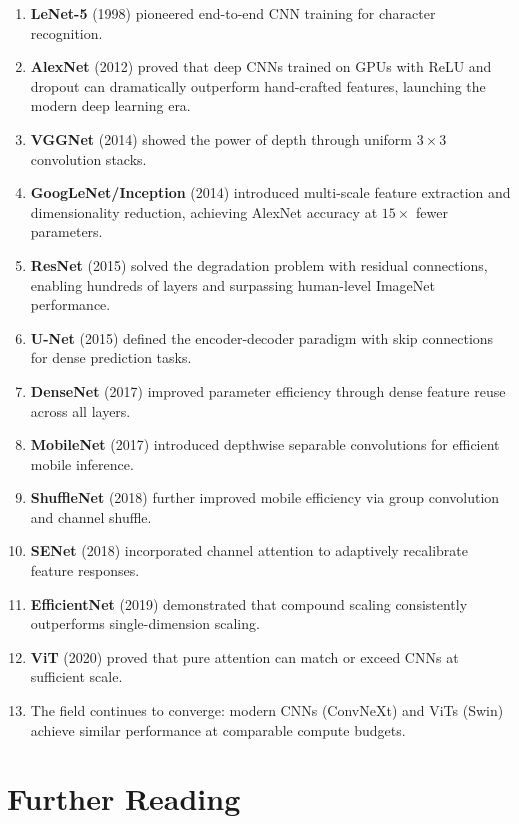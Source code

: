 \begin{enumerate}
    \item \textbf{LeNet-5} (1998) pioneered end-to-end CNN training for character recognition.
    \item \textbf{AlexNet} (2012) proved that deep CNNs trained on GPUs with ReLU and dropout can dramatically outperform hand-crafted features, launching the modern deep learning era.
    \item \textbf{VGGNet} (2014) showed the power of depth through uniform $3\times3$ convolution stacks.
    \item \textbf{GoogLeNet/Inception} (2014) introduced multi-scale feature extraction and dimensionality reduction, achieving AlexNet accuracy at $15\times$ fewer parameters.
    \item \textbf{ResNet} (2015) solved the degradation problem with residual connections, enabling hundreds of layers and surpassing human-level ImageNet performance.
    \item \textbf{U-Net} (2015) defined the encoder-decoder paradigm with skip connections for dense prediction tasks.
    \item \textbf{DenseNet} (2017) improved parameter efficiency through dense feature reuse across all layers.
    \item \textbf{MobileNet} (2017) introduced depthwise separable convolutions for efficient mobile inference.
    \item \textbf{ShuffleNet} (2018) further improved mobile efficiency via group convolution and channel shuffle.
    \item \textbf{SENet} (2018) incorporated channel attention to adaptively recalibrate feature responses.
    \item \textbf{EfficientNet} (2019) demonstrated that compound scaling consistently outperforms single-dimension scaling.
    \item \textbf{ViT} (2020) proved that pure attention can match or exceed CNNs at sufficient scale.
    \item The field continues to converge: modern CNNs (ConvNeXt) and ViTs (Swin) achieve similar performance at comparable compute budgets.
\end{enumerate}

\section{Further Reading}

